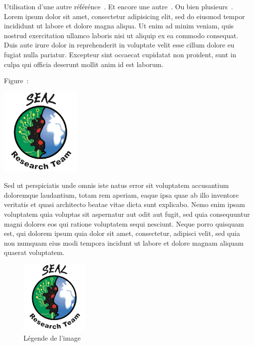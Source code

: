 Utilisation d'une autre référénce~\cite{NOM05}. Et encore une autre~\cite{NOM12}. Ou bien plusieurs~\cite{WEB13, NOM09, NOM07}.
Lorem ipsum dolor sit amet, consectetur adipisicing elit, sed do eiusmod tempor incididunt ut labore et dolore magna aliqua. Ut enim ad minim veniam, quis nostrud exercitation ullamco laboris nisi ut aliquip ex ea commodo consequat. Duis aute irure dolor in reprehenderit in voluptate velit esse cillum dolore eu fugiat nulla pariatur. Excepteur sint occaecat cupidatat non proident, sunt in culpa qui officia deserunt mollit anim id est laborum.

Figure~:

\includegraphics[width=0.3\textwidth]{./img/logo_equipe_robotique_exploration}

Sed ut perspiciatis unde omnis iste natus error sit voluptatem accusantium doloremque laudantium, totam rem aperiam, eaque ipsa quae ab illo inventore veritatis et quasi architecto beatae vitae dicta sunt explicabo. Nemo enim ipsam voluptatem quia voluptas sit aspernatur aut odit aut fugit, sed quia consequuntur magni dolores eos qui ratione voluptatem sequi nesciunt. Neque porro quisquam est, qui dolorem ipsum quia dolor sit amet, consectetur, adipisci velit, sed quia non numquam eius modi tempora incidunt ut labore et dolore magnam aliquam quaerat voluptatem. 

\begin{figure}
\begin{center}
	\includegraphics[width=0.3\textwidth]{./img/logo_equipe_robotique_exploration}
	\caption{Légende de l'image}
	\label{fig:image1}
\end{center}
\end{figure}

